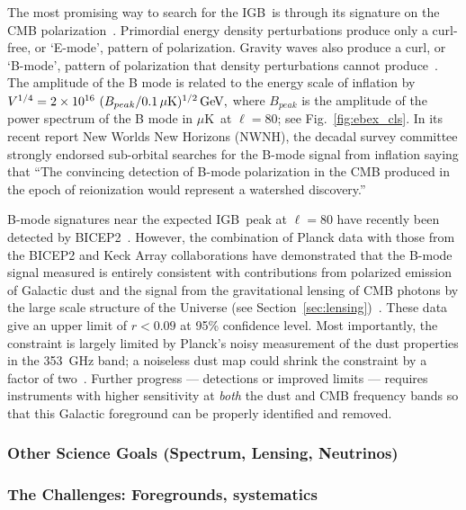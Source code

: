 \documentclass[12pt]{article}
\def\igb{IGB}
\def\microk{$\mu{\mbox{K}}$}
\begin{document}
The most promising way to search for the \igb\ is through its signature on the CMB polarization~\cite{kamionkowski97b,seljak97}.  
Primordial energy density perturbations produce only a curl-free, or `E-mode', pattern of polarization.
Gravity waves also produce a curl, or `B-mode', pattern of polarization that density perturbations cannot
produce~\cite{kamionkowski97a,zaldarriaga97}.  The amplitude of the B mode is related to the energy scale
of inflation by $V^{1/4}=2\times10^{16} \ ( B_{peak} / 0.1\,\mu{\rm
K})^{1/2} \,{\rm GeV},$ where $B_{peak}$ is the amplitude of the power spectrum of the B mode in \microk\ at $\ell=80$;
see Fig.~\ref{fig:ebex_cls}. In its recent report New Worlds New Horizons (NWNH), the decadal survey 
committee strongly endorsed sub-orbital searches for the B-mode signal from 
inflation saying that ``The convincing detection of B-mode polarization in the CMB produced in the 
epoch of reionization would represent a watershed discovery.''~\cite{blandford2010}

B-mode signatures near the expected \igb\ peak at $\ell=80$ have recently been detected by BICEP2~\cite{bicep2Bmode}. 
However, the combination of Planck data with those from the BICEP2 and Keck Array collaborations have demonstrated 
that the B-mode signal measured is entirely consistent with contributions from polarized emission of Galactic dust and the 
signal from the gravitational lensing of CMB photons by the large scale structure of the Universe (see 
Section~\ref{sec:lensing})~\cite{bkp2015,planck2014-XXX,2016PhRvL.116c1302B}. 
These data give an upper limit of $r<0.09$ at 95\% confidence level.
Most importantly, the constraint is largely limited by Planck's noisy measurement of the dust properties in the 353~GHz band; 
a noiseless dust map could shrink the constraint by a factor of two~\cite{bkp2015}. 
Further progress --- detections or improved limits --- requires instruments 
with higher sensitivity at {\it both} the dust and CMB frequency bands so that this Galactic foreground can be properly identified 
and removed. 

\vspace{-0.22in}

\subsubsection{Other Science Goals (Spectrum, Lensing, Neutrinos)}

\vspace{-0.05in}

\subsubsection{The Challenges: Foregrounds, systematics}
\label{sec:foregrounds}
\end{document}
